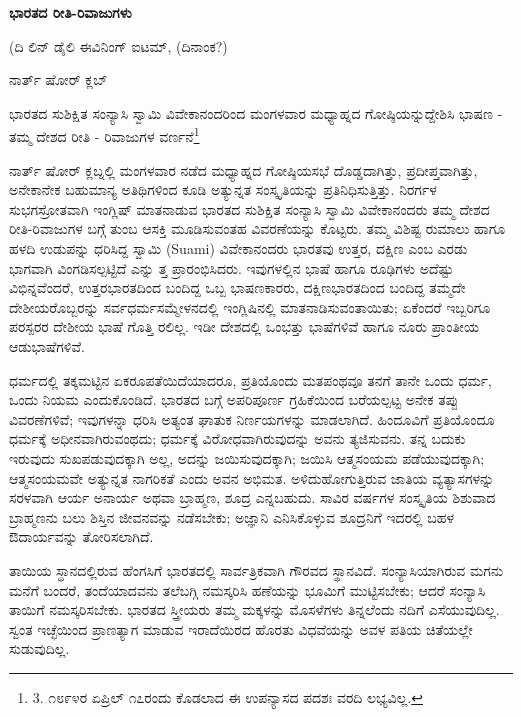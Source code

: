 \begin{center}
\textbf{ಭಾರತದ ರೀತಿ-ರಿವಾಜುಗಳು}
\end{center}

\begin{center}
(ದಿ ಲಿನ್ ಡೈಲಿ ಈವಿನಿಂಗ್ ಐಟಮ್​, (ದಿನಾಂಕ?)
\end{center}

\begin{center}
ನಾರ್ತ್ ಷೋರ್ ಕ್ಲಬ್
\end{center}

ಭಾರತದ ಸುಶಿಕ್ಷಿತ ಸಂನ್ಯಾಸಿ ಸ್ವಾಮಿ ವಿವೇಕಾನಂದರಿಂದ ಮಂಗಳವಾರ ಮಧ್ಯಾಹ್ನದ ಗೋಷ್ಠಿಯನ್ನುದ್ದೇಶಿಸಿ ಭಾಷಣ - ತಮ್ಮ ದೇಶದ ರೀತಿ - ರಿವಾಜುಗಳ ವರ್ಣನೆ\footnote{3. ೧೮೯೪ರ ಏಪ್ರಿಲ್ ೧೭ರಂದು ಕೊಡಲಾದ ಈ ಉಪನ್ಯಾಸದ ಪದಶಃ ವರದಿ ಲಭ್ಯವಿಲ್ಲ.}

ನಾರ್ತ್ ಷೋರ್ ಕ್ಲಬ್ನಲ್ಲಿ ಮಂಗಳವಾರ ನಡೆದ ಮಧ್ಯಾಹ್ನದ ಗೋಷ್ಠಿಯಸಭೆ ದೊಡ್ಡದಾಗಿತ್ತು, ಪ್ರದೀಪ್ತವಾಗಿತ್ತು, ಅನೇಕಾನೇಕ ಬಹುಮಾನ್ಯ ಅತಿಥಿಗಳಿಂದ ಕೂಡಿ ಅತ್ಯುನ್ನತ ಸಂಸ್ಕೃತಿಯನ್ನು ಪ್ರತಿನಿಧಿಸುತ್ತಿತ್ತು. ನಿರರ್ಗಳ ಸುಭಗಸ್ರೋತವಾಗಿ ಇಂಗ್ಲಿಷ್ ಮಾತನಾಡುವ ಭಾರತದ ಸುಶಿಕ್ಷಿತ ಸಂನ್ಯಾಸಿ ಸ್ವಾಮಿ ವಿವೇಕಾನಂದರು ತಮ್ಮ ದೇಶದ ರೀತಿ-ರಿವಾಜುಗಳ ಬಗ್ಗೆ ತುಂಬ ಆಸಕ್ತಿ ಮೂಡಿಸುವಂತಹ ವಿವರಣೆಯನ್ನು ಕೊಟ್ಟರು. ತಮ್ಮ ವಿಶಿಷ್ಟ ರುಮಾಲು ಹಾಗೂ ಹಳದಿ ಉಡುಪನ್ನು ಧರಿಸಿದ್ದ ಸ್ವಾಮಿ (Suami) ವಿವೇಕಾನಂದರು ಭಾರತವು ಉತ್ತರ, ದಕ್ಷಿಣ ಎಂಬ ಎರಡು ಭಾಗವಾಗಿ ವಿಂಗಡಿಸಲ್ಪಟ್ಟಿದೆ ಎನ್ನು ತ್ತ ಪ್ರಾರಂಭಿಸಿದರು. ಇವುಗಳಲ್ಲಿನ ಭಾಷೆ ಹಾಗೂ ರೂಢಿಗಳು ಅದೆಷ್ಟು ವಿಭಿನ್ನವೆಂದರೆ, ಉತ್ತರಭಾರತದಿಂದ ಬಂದಿದ್ದ ಒಬ್ಬ ಭಾಷಣಕಾರರು, ದಕ್ಷಿಣಭಾರತದಿಂದ ಬಂದಿದ್ದ ತಮ್ಮದೇ ದೇಶೀಯರೊಬ್ಬರನ್ನು ಸರ್ವಧರ್ಮಸಮ್ಮೇಳನದಲ್ಲಿ ಇಂಗ್ಲಿಷಿನಲ್ಲಿ ಮಾತನಾಡಿಸುವಂತಾಯಿತು; ಏಕೆಂದರೆ ಇಬ್ಬರಿಗೂ ಪರಸ್ಪರರ ದೇಶೀಯ ಭಾಷೆ ಗೊತ್ತಿ ರಲಿಲ್ಲ. ಇಡೀ ದೇಶದಲ್ಲಿ ಒಂಭತ್ತು ಭಾಷೆಗಳಿವೆ ಹಾಗೂ ನೂರು ಪ್ರಾಂತೀಯ ಆಡುಭಾಷೆಗಳಿವೆ.

ಧರ್ಮದಲ್ಲಿ ತಕ್ಕಮಟ್ಟಿನ ಏಕರೂಪತೆಯಿದೆಯಾದರೂ, ಪ್ರತಿಯೊಂದು ಮತಪಂಥವೂ ತನಗೆ ತಾನೇ ಒಂದು ಧರ್ಮ, ಒಂದು ನಿಯಮ ಎಂದುಕೊಂಡಿದೆ. ಭಾರತದ ಬಗ್ಗೆ ಅಪರಿಪೂರ್ಣ ಗ್ರಹಿಕೆಯಿಂದ ಬರೆಯಲ್ಪಟ್ಟ ಅನೇಕ ತಪ್ಪು ವಿವರಣೆಗಳಿವೆ; ಇವುಗಳನ್ನಾ ಧರಿಸಿ ಅತ್ಯಂತ ಘಾತುಕ ನಿರ್ಣಯಗಳನ್ನು ಮಾಡಲಾಗಿದೆ. ಹಿಂದೂವಿಗೆ ಪ್ರತಿಯೊಂದೂ ಧರ್ಮಕ್ಕೆ ಅಧೀನವಾಗಿರುವಂಥದು; ಧರ್ಮಕ್ಕೆ ವಿರೋಧವಾಗಿರುವುದನ್ನು ಅವನು ತ್ಯಜಿಸುವನು. ತನ್ನ ಬದುಕು ಇರುವುದು ಸುಖಪಡುವುದಕ್ಕಾಗಿ ಅಲ್ಲ, ಅದನ್ನು ಜಯಿಸುವುದಕ್ಕಾಗಿ; ಜಯಿಸಿ ಆತ್ಮಸಂಯಮ ಪಡೆಯುವುದಕ್ಕಾಗಿ; ಆತ್ಮಸಂಯಮವೇ ಅತ್ಯುನ್ನತ ನಾಗರಿಕತೆ ಎಂದು ಅವನ ಅಭಿಮತ. ಅಳಿದುಹೋಗುತ್ತಿರುವ ಜಾತಿಯ ವ್ಯತ್ಯಾಸಗಳನ್ನು ಸರಳವಾಗಿ ಆರ್ಯ ಅನಾರ್ಯ ಅಥವಾ ಬ್ರಾಹ್ಮಣ, ಶೂದ್ರ ಎನ್ನಬಹುದು. ಸಾವಿರ ವರ್ಷಗಳ ಸಂಸ್ಕೃತಿಯ ಶಿಶುವಾದ ಬ್ರಾಹ್ಮಣನು ಬಲು ಶಿಸ್ತಿನ ಜೀವನವನ್ನು ನಡೆಸಬೇಕು; ಅಜ್ಞಾನಿ ಎನಿಸಿಕೊಳ್ಳುವ ಶೂದ್ರನಿಗೆ ಇದರಲ್ಲಿ ಬಹಳ ಔದಾರ್ಯವನ್ನು ತೋರಿಸಲಾಗಿದೆ.

ತಾಯಿಯ ಸ್ಧಾನದಲ್ಲಿರುವ ಹೆಂಗಸಿಗೆ ಭಾರತದಲ್ಲಿ ಸಾರ್ವತ್ರಿಕವಾಗಿ ಗೌರವದ ಸ್ಥಾನವಿದೆ. ಸಂನ್ಯಾಸಿಯಾಗಿರುವ ಮಗನು ಮನೆಗೆ ಬಂದರೆ, ತಂದೆಯಾದವನು ತಲೆಬಗ್ಗಿ ನಮಸ್ಕರಿಸಿ ಹಣೆಯನ್ನು ಭೂಮಿಗೆ ಮುಟ್ಟಿಸಬೇಕು; ಆದರೆ ಸಂನ್ಯಾಸಿ ತಾಯಿಗೆ ನಮಸ್ಕರಿಸಬೇಕು. ಭಾರತದ ಸ್ತ್ರೀಯರು ತಮ್ಮ ಮಕ್ಕಳನ್ನು ಮೊಸಳೆಗಳು ತಿನ್ನಲೆಂದು ನದಿಗೆ ಎಸೆಯುವುದಿಲ್ಲ. ಸ್ವಂತ ಇಚ್ಛೆಯಿಂದ ಪ್ರಾಣತ್ಯಾಗ ಮಾಡುವ ಇರಾದೆಯಿರದ ಹೊರತು ವಿಧವೆಯನ್ನು ಅವಳ ಪತಿಯ ಚಿತೆಯಲ್ಲೇ ಸುಡುವುದಿಲ್ಲ.

